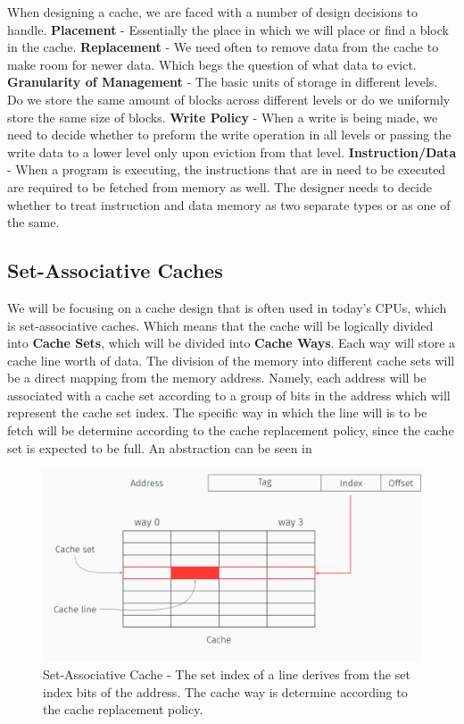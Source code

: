 When designing a cache, we are faced with a number of design decisions to
handle. \textbf{Placement}  - Essentially the place in which we will place or
find a block in the cache. \textbf{Replacement} - We need often to remove data
from the cache to make room for newer data. Which begs the question of what data
to evict. \textbf{Granularity of Management} - The basic units of storage in
different levels. Do we store the same amount of blocks across different levels
or do we uniformly store the same size of blocks. \textbf{Write Policy} - When a
write is being made, we need to decide whether to preform the write operation in
all levels or passing the write data to a lower level only upon eviction from
that level. \textbf{Instruction/Data} - When a program is executing, the
instructions that are in need to be executed are required to be fetched from
memory as well. The designer needs to decide whether to treat instruction and
data memory as two separate  types or as one of the same.


\subsection{Set-Associative Caches}
\label{subsec:setassoccaches}

We will be focusing on a cache design that is often used in today's CPUs, which
is set-associative caches. Which means that the cache will be logically divided
into \textbf{Cache Sets}, which will be divided into \textbf{Cache Ways}. Each
way will store a cache line worth of data. The division of the memory into
different cache sets will be a direct mapping from the memory address. Namely,
each address will be associated with a cache set according to a group of bits in
the address which will represent the cache set index. The specific way in which
the line will is to be fetch will be determine according to the cache
replacement policy, since the cache set is expected to be full.  An abstraction
can be seen in 


\begin{figure}
    \centering
    \includegraphics[width=\textwidth]{images/chapter_6/SetWay.PNG}
    \caption{Set-Associative Cache - The set index of a line derives from the set index bits of the address. The cache way is determine according to the cache replacement policy.}
    \label{fig:SetWay}
\end{figure}

